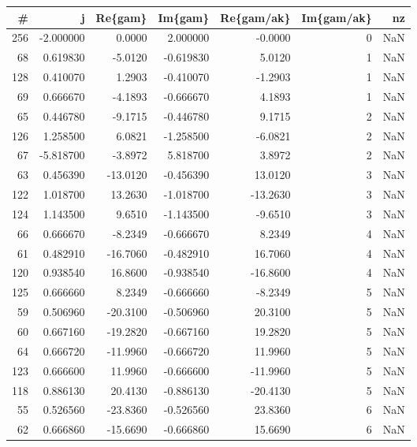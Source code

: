 \begin{tabular}{rrrrrrr}
\toprule
  \# &          j &   Re\{gam\} &    Im\{gam\} &  Re\{gam/ak\} &  Im\{gam/ak\} &  nz \\
\midrule
256 &  -2.000000 &    0.0000 &   2.000000 &     -0.0000 &           0 & NaN \\
 68 &   0.619830 &   -5.0120 &  -0.619830 &      5.0120 &           1 & NaN \\
128 &   0.410070 &    1.2903 &  -0.410070 &     -1.2903 &           1 & NaN \\
 69 &   0.666670 &   -4.1893 &  -0.666670 &      4.1893 &           1 & NaN \\
 65 &   0.446780 &   -9.1715 &  -0.446780 &      9.1715 &           2 & NaN \\
126 &   1.258500 &    6.0821 &  -1.258500 &     -6.0821 &           2 & NaN \\
 67 &  -5.818700 &   -3.8972 &   5.818700 &      3.8972 &           2 & NaN \\
 63 &   0.456390 &  -13.0120 &  -0.456390 &     13.0120 &           3 & NaN \\
122 &   1.018700 &   13.2630 &  -1.018700 &    -13.2630 &           3 & NaN \\
124 &   1.143500 &    9.6510 &  -1.143500 &     -9.6510 &           3 & NaN \\
 66 &   0.666670 &   -8.2349 &  -0.666670 &      8.2349 &           4 & NaN \\
 61 &   0.482910 &  -16.7060 &  -0.482910 &     16.7060 &           4 & NaN \\
120 &   0.938540 &   16.8600 &  -0.938540 &    -16.8600 &           4 & NaN \\
125 &   0.666660 &    8.2349 &  -0.666660 &     -8.2349 &           5 & NaN \\
 59 &   0.506960 &  -20.3100 &  -0.506960 &     20.3100 &           5 & NaN \\
 60 &   0.667160 &  -19.2820 &  -0.667160 &     19.2820 &           5 & NaN \\
 64 &   0.666720 &  -11.9960 &  -0.666720 &     11.9960 &           5 & NaN \\
123 &   0.666600 &   11.9960 &  -0.666600 &    -11.9960 &           5 & NaN \\
118 &   0.886130 &   20.4130 &  -0.886130 &    -20.4130 &           5 & NaN \\
 55 &   0.526560 &  -23.8360 &  -0.526560 &     23.8360 &           6 & NaN \\
 62 &   0.666860 &  -15.6690 &  -0.666860 &     15.6690 &           6 & NaN \\

\end{tabular}
